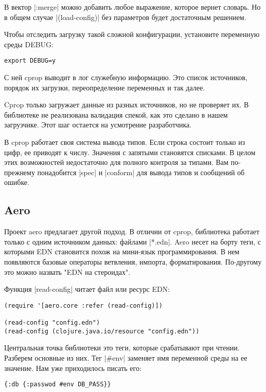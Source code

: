 В вектор \spverb|:merge| можно добавить любое выражение, которое вернет словарь. Но в
общем случае \spverb|(load-config)| без параметров будет достаточным решением.

Чтобы отследить загрузку такой сложной конфигурации, установите переменную среды
DEBUG:

\begin{verbatim}
export DEBUG=y
\end{verbatim}

С ней cprop выводит в лог служебную информацию. Это список источников, порядок
их загрузки, переопределение переменных и так далее.

Cprop только загружает данные из разных источников, но не проверяет их. В
библиотеке не реализована валидация спекой, как это сделано в нашем
загрузчике. Этот шаг остается на усмотрение разработчика.

В cprop работает своя система вывода типов. Если строка состоит только из цифр,
ее приводят к числу. Значения с запятыми становятся списками. В целом этих
возможностей недостаточно для полного контроля за типами. Вам по-прежнему
понадобится \spverb|spec| и \spverb|conform| для вывода типов и сообщений об ошибке.

\subsection{Aero}

Проект aero предлагает другой подход. В отличии от cprop, библиотека работает
только с одним источником данных: файлами \spverb|*.edn|. Aero несет на борту теги, с
которыми EDN становится похож на мини-язык программирования. В нем появляются
базовые операторы ветвления, импорта, форматирования. По-другому это можно
назвать "EDN на стероидах".

Функция \spverb|read-config| читает файл или ресурс EDN:

\begin{verbatim}
(require '[aero.core :refer (read-config)])

(read-config "config.edn")
(read-config (clojure.java.io/resource "config.edn"))
\end{verbatim}

Центральная точка библиотеки это теги, которые срабатывают при чтении. Разберем
основные из них. Тег \spverb|#env| заменяет имя переменной среды на ее значение. Нам
уже приходилось писать его:

\begin{verbatim}
{:db {:passwod #env DB_PASS}}
\end{verbatim}

